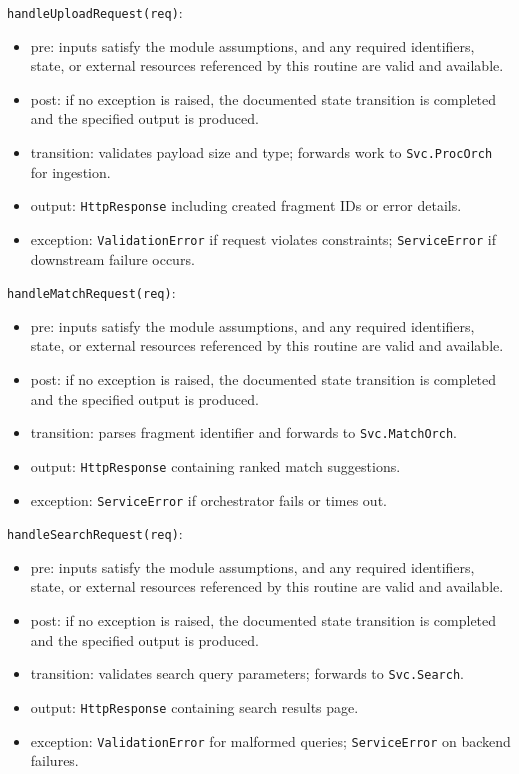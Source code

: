 \documentclass[12pt, titlepage]{article}
\begin{document}
\noindent \texttt{handleUploadRequest(req)}:
\begin{itemize}
    \item pre: inputs satisfy the module assumptions, and any required identifiers, state, or external resources referenced by this routine are valid and available.
    \item post: if no exception is raised, the documented state transition is completed and the specified output is produced.
    \item transition: validates payload size and type; forwards work to \texttt{Svc.ProcOrch} for ingestion.
    \item output: \texttt{HttpResponse} including created fragment IDs or error details.
    \item exception: \texttt{ValidationError} if request violates constraints; \texttt{ServiceError} if downstream failure occurs.
\end{itemize}

\noindent \texttt{handleMatchRequest(req)}:
\begin{itemize}
    \item pre: inputs satisfy the module assumptions, and any required identifiers, state, or external resources referenced by this routine are valid and available.
    \item post: if no exception is raised, the documented state transition is completed and the specified output is produced.
    \item transition: parses fragment identifier and forwards to \texttt{Svc.MatchOrch}.
    \item output: \texttt{HttpResponse} containing ranked match suggestions.
    \item exception: \texttt{ServiceError} if orchestrator fails or times out.
\end{itemize}

\noindent \texttt{handleSearchRequest(req)}:
\begin{itemize}
    \item pre: inputs satisfy the module assumptions, and any required identifiers, state, or external resources referenced by this routine are valid and available.
    \item post: if no exception is raised, the documented state transition is completed and the specified output is produced.
    \item transition: validates search query parameters; forwards to \texttt{Svc.Search}.
    \item output: \texttt{HttpResponse} containing search results page.
    \item exception: \texttt{ValidationError} for malformed queries; \texttt{ServiceError} on backend failures.
\end{itemize}
\end{document}
